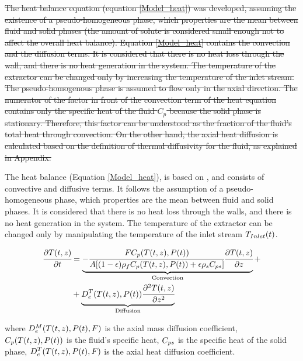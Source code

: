 \documentclass[../Article_Model_Parameters.tex]{subfiles}
\begin{document}
		\sout{The heat balance equation (equation  \ref{Model_heat}) was developed, assuming the existence of a pseudo-homogeneous phase, which properties are the mean between fluid and solid phases (the amount of solute is considered small enough not to affect the overall heat balance). Equation \ref{Model_heat} contains the convection and the diffusion terms. It is considered that there is no heat loss through the wall, and there is no heat generation in the system. The temperature of the extractor can be changed only by increasing the temperature of the inlet stream. The pseudo-homogenous phase is assumed to flow only in the axial direction. The numerator of the factor in front of the convection term of the heat equation contains only the specific heat of the fluid $C_p$ because the solid phase is stationary. Therefore, this factor can be understood as the fraction of the fluid's total heat through convection. On the other hand, the axial heat diffusion is calculated based on the definition of thermal diffusivity for the fluid, as explained in Appendix. }
			
		{\color{black} The heat balance (Equation \ref{Model_heat}), is based on \citet{Srinivasan2012}, and consists of convective and diffusive terms. It follows the assumption of a pseudo-homogeneous phase, which properties are the mean between fluid and solid phases. It is considered that there is no heat loss through the walls, and there is no heat generation in the system. The temperature of the extractor can be changed only by manipulating the temperature of the inlet stream ${\color{black}T_{Inlet}}(t)$.
			}
			
			{\footnotesize
				\begin{equation} \label{Model_heat}
					\begin{split}
						\cfrac{\partial T(t,z)}{\partial t} &= 
						\underbrace{ -\cfrac{F {\color{black}C_p}(T(t,z),{\color{black}P}(t))}{{\color{black}A} 	[(1-{\color{black}\epsilon})\rho_f {\color{black}C_p} (T(t,z),{\color{black}P}(t)) + {\color{black} \epsilon \rho_s C_{ps} } ]} \cfrac{\partial T(t,z)}{\partial z}  }_{\text{Convection}} + \\
						& + \underbrace{ {\color{black}D^T_e}(T(t,z),{\color{black}P}(t)) \cfrac{\partial^2 T(t,z)}{\partial {\color{black}z^2}} }_{\text{Diffusion}}
					\end{split}
			\end{equation} }
			
		where $ {\color{black}D^M_e}(T(t,z),{\color{black}P}(t),F)$ is the axial mass diffusion coefficient, ${\color{black}C_p}(T(t,z),{\color{black}P}(t))$ is the fluid's specific heat, ${\color{black}C_{ps}}$ is the specific heat of the solid phase, ${\color{black}D^T_e}(T(t,z),{\color{black}P}(t),F)$ is the axial heat diffusion coefficient. 
\end{document}
